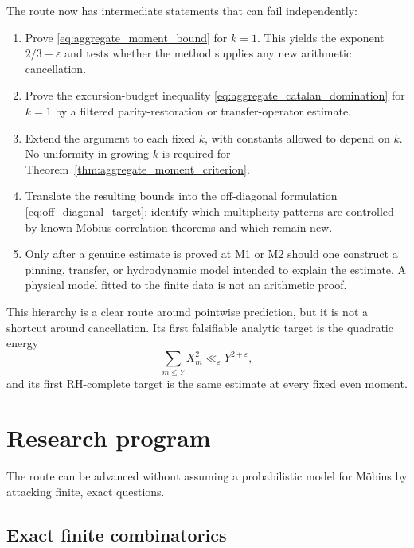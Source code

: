 \documentclass[11pt]{amsart}
\numberwithin{equation}{section}
\theoremstyle{plain}
\theoremstyle{definition}
\theoremstyle{remark}
\newcommand{\eps}{\varepsilon}
\begin{document}
The route now has intermediate statements that can fail independently:
\begin{enumerate}[label=(M\arabic*)]
\item Prove \eqref{eq:aggregate_moment_bound} for $k=1$.  This yields the
      exponent $2/3+\eps$ and tests whether the method supplies any new
      arithmetic cancellation.
\item Prove the excursion-budget inequality
      \eqref{eq:aggregate_catalan_domination} for $k=1$ by a filtered
      parity-restoration or transfer-operator estimate.
\item Extend the argument to each fixed $k$, with constants allowed to depend
      on $k$.  No uniformity in growing $k$ is required for
      Theorem~\ref{thm:aggregate_moment_criterion}.
\item Translate the resulting bounds into the off-diagonal formulation
      \eqref{eq:off_diagonal_target}; identify which multiplicity patterns are
      controlled by known M\"obius correlation theorems and which remain new.
\item Only after a genuine estimate is proved at M1 or M2 should one construct
      a pinning, transfer, or hydrodynamic model intended to explain the
      estimate.  A physical model fitted to the finite data is not an
      arithmetic proof.
\end{enumerate}

This hierarchy is a clear route around pointwise prediction, but it is not a
shortcut around cancellation.  Its first falsifiable analytic target is the
quadratic energy
\begin{equation}
\sum_{m\leq Y}X_m^2\ll_\eps Y^{2+\eps},
\label{eq:first_quadratic_target}
\end{equation}
and its first RH-complete target is the same estimate at every fixed even
moment.

\section{Research program}
\label{sec:research_program}

The route can be advanced without assuming a probabilistic model for M\"obius by attacking finite, exact questions.

\subsection{Exact finite combinatorics}
\label{subsec:program_exact}
\end{document}
